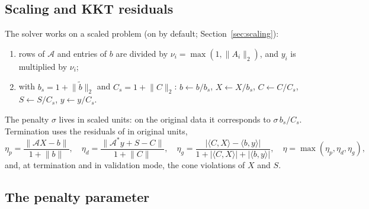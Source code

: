 \documentclass[11pt]{article}
\newcommand{\A}{\mathcal{A}}
\newcommand{\Ad}{\mathcal{A}^{*}}
\newcommand{\inner}[2]{\langle #1, #2\rangle}
\newcommand{\norm}[1]{\lVert #1\rVert}
\begin{document}
\subsection{Scaling and KKT residuals}\label{sec:math-scaling}
The solver works on a scaled problem (on by default; Section~\ref{sec:scaling}):
\begin{enumerate}
  \item rows of $\A$ and entries of $b$ are divided by $\nu_i = \max(1,\norm{A_i}_2)$, and $y_i$ is multiplied by $\nu_i$;
  \item with $b_s = 1+\norm{\tilde b}_2$ and $C_s = 1+\norm{C}_2$: $b\leftarrow b/b_s$, $X\leftarrow X/b_s$,
  $C\leftarrow C/C_s$, $S\leftarrow S/C_s$, $y\leftarrow y/C_s$.
\end{enumerate}
The penalty $\sigma$ lives in scaled units: on the original data it corresponds to $\sigma\, b_s/C_s$.
Termination uses the residuals of \cite[eqs.~(12)--(13)]{cuadmm} in original units,
\[
\eta_p = \frac{\norm{\A X - b}}{1+\norm{b}},\quad
\eta_d = \frac{\norm{\Ad y + S - C}}{1+\norm{C}},\quad
\eta_g = \frac{|\inner{C}{X}-\inner{b}{y}|}{1+|\inner{C}{X}|+|\inner{b}{y}|},\quad
\eta = \max(\eta_p,\eta_d,\eta_g),
\]
and, at termination and in validation mode, the cone violations of $X$ and $S$.

\subsection{The penalty parameter}\label{sec:penalty}
\end{document}
